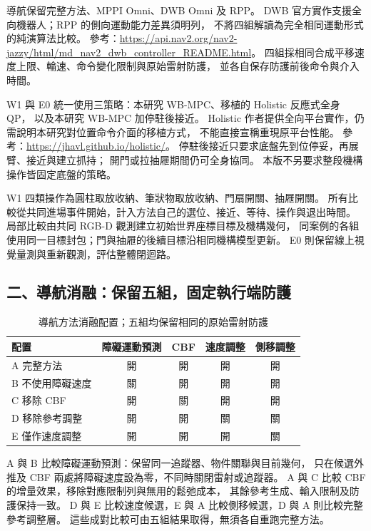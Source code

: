 導航保留完整方法、MPPI Omni、DWB Omni 及 RPP。
DWB 官方實作支援全向機器人；RPP 的側向運動能力差異須明列，
不將四組解讀為完全相同運動形式的純演算法比較。
參考：\url{https://api.nav2.org/nav2-jazzy/html/md_nav2_dwb_controller_README.html}。
四組採相同合成平移速度上限、輪速、命令變化限制與原始雷射防護，
並各自保存防護前後命令與介入時間。

W1 與 E0 統一使用三策略：本研究 WB-MPC、移植的 Holistic 反應式全身 QP，
以及本研究 WB-MPC 加停駐後接近。
Holistic 作者提供全向平台實作，仍需說明本研究對位置命令介面的移植方式，
不能直接宣稱重現原平台性能。
參考：\url{https://jhavl.github.io/holistic/}。
停駐後接近只要求底盤先到位停妥，再展臂、接近與建立抓持；
開門或拉抽屜期間仍可全身協同。
本版不另要求整段機構操作皆固定底盤的策略。

W1 四類操作為圓柱取放收納、筆狀物取放收納、門扇開關、抽屜開關。
所有比較從共同進場事件開始，計入方法自己的選位、接近、等待、操作與退出時間。
局部比較由共同 RGB-D 觀測建立初始世界座標目標及機構幾何，
同案例的各組使用同一目標封包；門與抽屜的後續目標沿相同機構模型更新。
E0 則保留線上視覺量測與重新觀測，評估整體閉迴路。

\subsection*{二、導航消融：保留五組，固定執行端防護}

\begin{table}[htbp]
    \centering
    \caption{導航方法消融配置；五組均保留相同的原始雷射防護}
    \label{tab:method_focused_nav_ablation}
    \small
    \renewcommand{\arraystretch}{1.2}
    \begin{tabular}{l c c c c}
        \hline
        配置 & 障礙運動預測 & CBF & 速度調整 & 側移調整 \\
        \hline
        A 完整方法 & 開 & 開 & 開 & 開 \\
        B 不使用障礙速度 & 關 & 開 & 開 & 開 \\
        C 移除 CBF & 開 & 關 & 開 & 開 \\
        D 移除參考調整 & 開 & 開 & 關 & 關 \\
        E 僅作速度調整 & 開 & 開 & 開 & 關 \\
        \hline
    \end{tabular}
\end{table}

A 與 B 比較障礙運動預測：保留同一追蹤器、物件關聯與目前幾何，
只在候選外推及 CBF 兩處將障礙速度設為零，不同時關閉雷射或追蹤器。
A 與 C 比較 CBF 的增量效果，移除對應限制列與無用的鬆弛成本，
其餘參考生成、輸入限制及防護保持一致。
D 與 E 比較速度候選，E 與 A 比較側移候選，D 與 A 則比較完整參考調整層。
這些成對比較可由五組結果取得，無須各自重跑完整方法。

